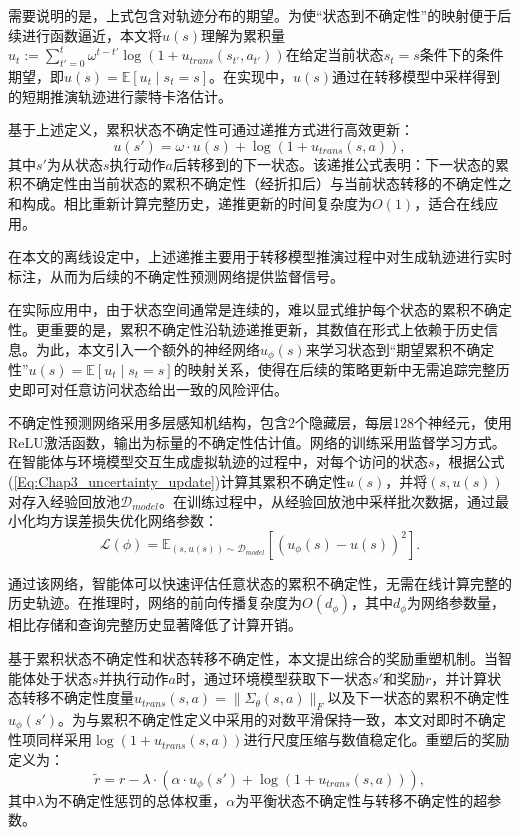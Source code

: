 需要说明的是，上式包含对轨迹分布的期望。为使“状态到不确定性”的映射便于后续进行函数逼近，本文将$u(s)$理解为累积量$u_t:=\sum_{t'=0}^{t} \omega^{t-t'} \log\left(1 + u_{trans}(s_{t'}, a_{t'})\right)$在给定当前状态$s_t=s$条件下的条件期望，即$u(s)=\mathbb{E}[u_t\mid s_t=s]$。在实现中，$u(s)$通过在转移模型中采样得到的短期推演轨迹进行蒙特卡洛估计。

基于上述定义，累积状态不确定性可通过递推方式进行高效更新：
\begin{equation}\label{Eq:Chap3_uncertainty_update}
  u(s') = \omega \cdot u(s) + \log\left(1 + u_{trans}(s, a)\right),
\end{equation}
其中$s'$为从状态$s$执行动作$a$后转移到的下一状态。该递推公式表明：下一状态的累积不确定性由当前状态的累积不确定性（经折扣后）与当前状态转移的不确定性之和构成。相比重新计算完整历史，递推更新的时间复杂度为$O(1)$，适合在线应用。

在本文的离线设定中，上述递推主要用于转移模型推演过程中对生成轨迹进行实时标注，从而为后续的不确定性预测网络提供监督信号。

在实际应用中，由于状态空间通常是连续的，难以显式维护每个状态的累积不确定性。更重要的是，累积不确定性沿轨迹递推更新，其数值在形式上依赖于历史信息。为此，本文引入一个额外的神经网络$u_\phi(s)$来学习状态到“期望累积不确定性”$u(s)=\mathbb{E}[u_t\mid s_t=s]$的映射关系，使得在后续的策略更新中无需追踪完整历史即可对任意访问状态给出一致的风险评估。

不确定性预测网络采用多层感知机结构，包含2个隐藏层，每层128个神经元，使用ReLU激活函数，输出为标量的不确定性估计值。网络的训练采用监督学习方式。在智能体与环境模型交互生成虚拟轨迹的过程中，对每个访问的状态$s$，根据公式(\ref{Eq:Chap3_uncertainty_update})计算其累积不确定性$u(s)$，并将$(s, u(s))$对存入经验回放池$\mathcal{D}_{model}$。在训练过程中，从经验回放池中采样批次数据，通过最小化均方误差损失优化网络参数：
\begin{equation}\label{Eq:Chap3_uncertainty_loss}
  \mathcal{L}(\phi) = \mathbb{E}_{(s, u(s)) \sim \mathcal{D}_{model}}\left[\left(u_\phi(s) - u(s)\right)^2\right].
\end{equation}

通过该网络，智能体可以快速评估任意状态的累积不确定性，无需在线计算完整的历史轨迹。在推理时，网络的前向传播复杂度为$O(d_\phi)$，其中$d_\phi$为网络参数量，相比存储和查询完整历史显著降低了计算开销。



基于累积状态不确定性和状态转移不确定性，本文提出综合的奖励重塑机制。当智能体处于状态$s$并执行动作$a$时，通过环境模型获取下一状态$s'$和奖励$r$，并计算状态转移不确定性度量$u_{trans}(s,a)=\|\Sigma_\theta(s,a)\|_F$以及下一状态的累积不确定性$u_\phi(s')$。为与累积不确定性定义中采用的对数平滑保持一致，本文对即时不确定性项同样采用$\log(1+u_{trans}(s,a))$进行尺度压缩与数值稳定化。重塑后的奖励定义为：
\begin{equation}\label{Eq:Chap3_reward_shaping}
  \tilde{r} = r - \lambda \cdot \left(\alpha \cdot u_\phi(s') + \log\left(1 + u_{trans}(s, a)\right)\right),
\end{equation}
其中$\lambda$为不确定性惩罚的总体权重，$\alpha$为平衡状态不确定性与转移不确定性的超参数。

